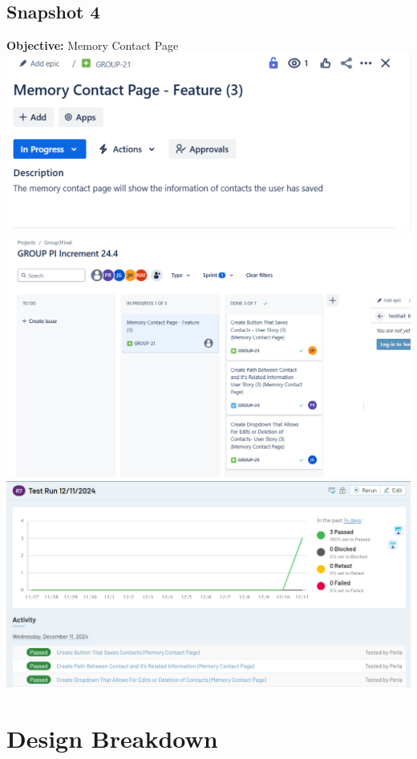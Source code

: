 \documentclass[12pt]{article}
\begin{document}
\subsection{Snapshot 4}
\textbf{Objective:} Memory Contact Page\newline
\includegraphics{snapshot4img1.png}\newline
\includegraphics{snapshot4img2.png}
\includegraphics{snapshot4img3.png}


\section{Design Breakdown}
\end{document}
